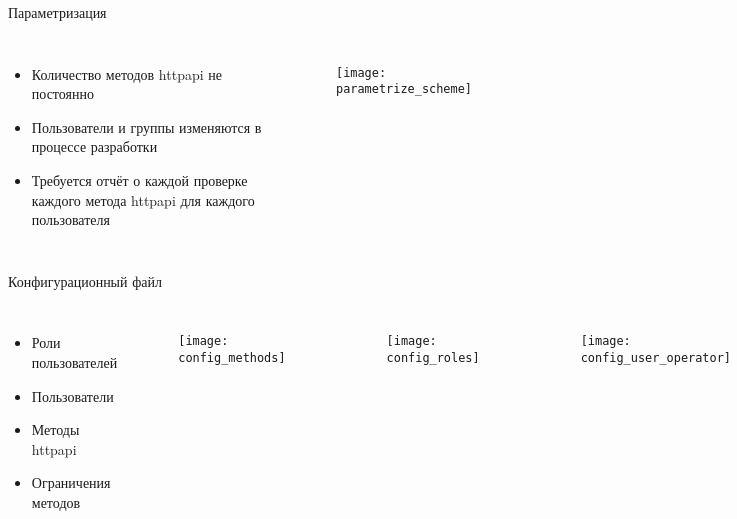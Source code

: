 \begin{frame}{Параметризация}
    \begin{columns}
            \begin{itemize}
                \item Количество методов httpapi не постоянно
                \item Пользователи и группы изменяются в процессе разработки
                \item Требуется отчёт о каждой проверке каждого метода httpapi для каждого пользователя
            \end{itemize}
            \begin{figure}[h!]
                \centering
                \texttt{[image: parametrize\_scheme]}
                \label{img:parametrize_scheme}
            \end{figure}
    \end{columns}
\end{frame}

\begin{frame}{Конфигурационный файл}
    \begin{columns}
            \begin{itemize}
                \item Роли пользователей
                \item Пользователи
                \item Методы httpapi
                \item Ограничения методов
            \end{itemize}
            \begin{figure}[h!]
                \centering
                \texttt{[image: config\_methods]}
                \label{img:config_methods}
            \end{figure}
            \begin{figure}[h!]
                \centering
                \texttt{[image: config\_roles]}
                \label{img:config_roles}
            \end{figure}
            \begin{figure}[h!]
                \centering
                \texttt{[image: config\_user\_operator]}
                \label{img:config_user_operator}
            \end{figure}
    \end{columns}
\end{frame}

